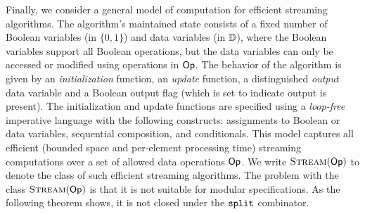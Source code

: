 Finally, we consider a general model of computation for efficient streaming algorithms. The algorithm's maintained state consists of a fixed number of Boolean variables (in $\{0,1\}$) and data variables (in $\mathbb{D}$), where the Boolean variables support all Boolean operations, but the data variables can only be accessed or modified using operations in $\textsf{Op}$. The behavior of the algorithm is given by an \emph{initialization} function, an \emph{update} function, a distinguished \emph{output} data variable and a Boolean output flag (which is set to indicate output is present). The initialization and update functions are specified using a \emph{loop-free} imperative language with the following constructs: assignments to Boolean or data variables, sequential composition, and conditionals. This model captures all efficient (bounded space and per-element processing time) streaming computations over a set of allowed data operations $\textsf{Op}$. We write $\textsc{Stream}(\textsf{Op})$ to denote the class of such efficient streaming algorithms. The problem with the class $\textsc{Stream}(\textsf{Op})$ is that it is not suitable for modular specifications. As the following theorem shows, it is not closed under the $\texttt{split}$ combinator.

